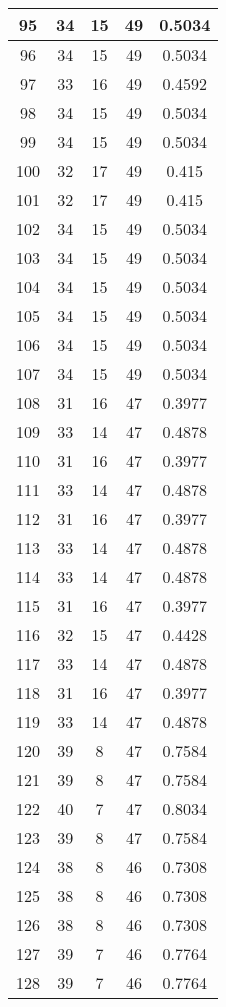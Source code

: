 \documentclass[letterpaper, 12pt]{article}
\begin{document}
\begin{longtable}{|c|c|c|c|c|}
\hline
95 & 34 & 15 & 49 & 0.5034 \\
\hline
96 & 34 & 15 & 49 & 0.5034 \\
\hline
97 & 33 & 16 & 49 & 0.4592 \\
\hline
98 & 34 & 15 & 49 & 0.5034 \\
\hline
99 & 34 & 15 & 49 & 0.5034 \\
\hline
100 & 32 & 17 & 49 & 0.415 \\
\hline
101 & 32 & 17 & 49 & 0.415 \\
\hline
102 & 34 & 15 & 49 & 0.5034 \\
\hline
103 & 34 & 15 & 49 & 0.5034 \\
\hline
104 & 34 & 15 & 49 & 0.5034 \\
\hline
105 & 34 & 15 & 49 & 0.5034 \\
\hline
106 & 34 & 15 & 49 & 0.5034 \\
\hline
107 & 34 & 15 & 49 & 0.5034 \\
\hline
108 & 31 & 16 & 47 & 0.3977 \\
\hline
109 & 33 & 14 & 47 & 0.4878 \\
\hline
110 & 31 & 16 & 47 & 0.3977 \\
\hline
111 & 33 & 14 & 47 & 0.4878 \\
\hline
112 & 31 & 16 & 47 & 0.3977 \\
\hline
113 & 33 & 14 & 47 & 0.4878 \\
\hline
114 & 33 & 14 & 47 & 0.4878 \\
\hline
115 & 31 & 16 & 47 & 0.3977 \\
\hline
116 & 32 & 15 & 47 & 0.4428 \\
\hline
117 & 33 & 14 & 47 & 0.4878 \\
\hline
118 & 31 & 16 & 47 & 0.3977 \\
\hline
119 & 33 & 14 & 47 & 0.4878 \\
\hline
120 & 39 & 8 & 47 & 0.7584 \\
\hline
121 & 39 & 8 & 47 & 0.7584 \\
\hline
122 & 40 & 7 & 47 & 0.8034 \\
\hline
123 & 39 & 8 & 47 & 0.7584 \\
\hline
124 & 38 & 8 & 46 & 0.7308 \\
\hline
125 & 38 & 8 & 46 & 0.7308 \\
\hline
126 & 38 & 8 & 46 & 0.7308 \\
\hline
127 & 39 & 7 & 46 & 0.7764 \\
\hline
128 & 39 & 7 & 46 & 0.7764 \\

\end{longtable}
\end{document}
